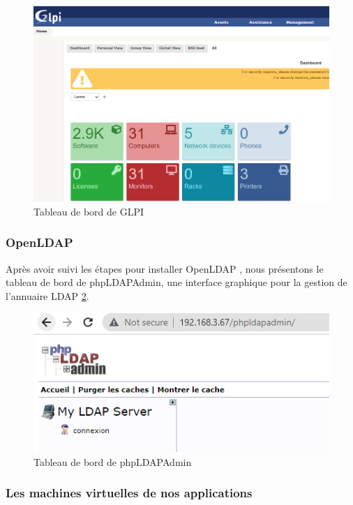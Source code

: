 \begin{figure}[H]
\centering
\includegraphics[width=15cm]{Images/GLPI.png}
\caption{Tableau de bord de GLPI}
\label{fig:glpi-dashboard}
\end{figure}




\subsubsection{OpenLDAP}

Après avoir suivi les étapes pour installer OpenLDAP \cite{patil2020openldap}, nous présentons le tableau de bord de phpLDAPAdmin, une interface graphique pour la gestion de l'annuaire LDAP \ref{fig:ldap-dashboard}.

\begin{figure}[H]
\centering
\includegraphics[width=15cm]{Images/ldapdashboard.png}
\caption{Tableau de bord de phpLDAPAdmin}
\label{fig:ldap-dashboard}
\end{figure}

\subsubsection{Les machines virtuelles de nos applications}


